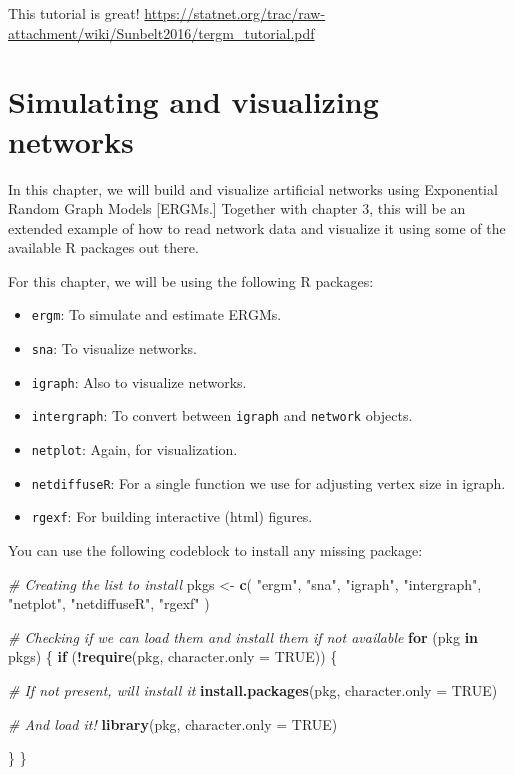 \documentclass[
]{book}
\newenvironment{Shaded}{\begin{snugshade}}{\end{snugshade}}
\newcommand{\AttributeTok}[1]{\textcolor[rgb]{0.13,0.29,0.53}{#1}}
\newcommand{\CommentTok}[1]{\textcolor[rgb]{0.56,0.35,0.01}{\textit{#1}}}
\newcommand{\ConstantTok}[1]{\textcolor[rgb]{0.56,0.35,0.01}{#1}}
\newcommand{\ControlFlowTok}[1]{\textcolor[rgb]{0.13,0.29,0.53}{\textbf{#1}}}
\newcommand{\FunctionTok}[1]{\textcolor[rgb]{0.13,0.29,0.53}{\textbf{#1}}}
\newcommand{\NormalTok}[1]{#1}
\newcommand{\OtherTok}[1]{\textcolor[rgb]{0.56,0.35,0.01}{#1}}
\newcommand{\SpecialCharTok}[1]{\textcolor[rgb]{0.81,0.36,0.00}{\textbf{#1}}}
\newcommand{\StringTok}[1]{\textcolor[rgb]{0.31,0.60,0.02}{#1}}
\providecommand{\tightlist}{%
  \setlength{\itemsep}{0pt}\setlength{\parskip}{0pt}}
\begin{document}
This tutorial is great! \url{https://statnet.org/trac/raw-attachment/wiki/Sunbelt2016/tergm_tutorial.pdf}

\hypertarget{simulating-and-visualizing-networks}{%
\chapter{Simulating and visualizing networks}\label{simulating-and-visualizing-networks}}

In this chapter, we will build and visualize artificial networks using Exponential
Random Graph Models {[}ERGMs.{]} Together with chapter 3, this will be an extended
example of how to read network data and visualize it using some of the available
R packages out there.

For this chapter, we will be using the following R packages:

\begin{itemize}
\tightlist
\item
  \texttt{ergm}: To simulate and estimate ERGMs.
\item
  \texttt{sna}: To visualize networks.
\item
  \texttt{igraph}: Also to visualize networks.
\item
  \texttt{intergraph}: To convert between \texttt{igraph} and \texttt{network} objects.
\item
  \texttt{netplot}: Again, for visualization.
\item
  \texttt{netdiffuseR}: For a single function we use for adjusting vertex size in igraph.
\item
  \texttt{rgexf}: For building interactive (html) figures.
\end{itemize}

You can use the following codeblock to install any missing package:

\begin{Shaded}
\begin{Highlighting}[]
\CommentTok{\# Creating the list to install}
\NormalTok{pkgs }\OtherTok{\textless{}{-}} \FunctionTok{c}\NormalTok{(}
  \StringTok{"ergm"}\NormalTok{, }\StringTok{"sna"}\NormalTok{, }\StringTok{"igraph"}\NormalTok{, }\StringTok{"intergraph"}\NormalTok{, }\StringTok{"netplot"}\NormalTok{, }\StringTok{"netdiffuseR"}\NormalTok{, }\StringTok{"rgexf"}
\NormalTok{  )}

\CommentTok{\# Checking if we can load them and install them if not available}
\ControlFlowTok{for}\NormalTok{ (pkg }\ControlFlowTok{in}\NormalTok{ pkgs) \{}
  \ControlFlowTok{if}\NormalTok{ (}\SpecialCharTok{!}\FunctionTok{require}\NormalTok{(pkg, }\AttributeTok{character.only =} \ConstantTok{TRUE}\NormalTok{)) \{}

    \CommentTok{\# If not present, will install it}
    \FunctionTok{install.packages}\NormalTok{(pkg, }\AttributeTok{character.only =} \ConstantTok{TRUE}\NormalTok{)}

    \CommentTok{\# And load it!}
    \FunctionTok{library}\NormalTok{(pkg, }\AttributeTok{character.only =} \ConstantTok{TRUE}\NormalTok{)}

\NormalTok{  \}}
\NormalTok{\}}
\end{Highlighting}
\end{Shaded}
\end{document}
